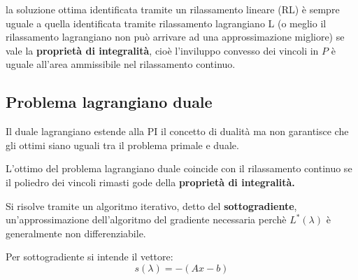 \documentclass[\main/main.tex]{subfiles}
\begin{document}
\begin{theorem}
  la soluzione ottima identificata tramite un rilassamento lineare (RL) è sempre uguale a quella identificata tramite rilassamento lagrangiano L (o meglio il rilassamento lagrangiano non può arrivare ad una approssimazione migliore) se vale la \textbf{proprietà di integralità}, cioè l'inviluppo convesso dei vincoli in $P$ è uguale all'area ammissibile nel rilassamento continuo.
\end{theorem}

\subsection{Problema lagrangiano duale}
Il duale lagrangiano estende alla PI il concetto di dualità ma non garantisce che gli ottimi siano uguali tra il problema primale e duale.

\begin{theorem}
  L'ottimo del problema lagrangiano duale coincide con il rilassamento continuo se il poliedro dei vincoli rimasti gode della \textbf{proprietà di integralità.}
\end{theorem}

Si risolve tramite un algoritmo iterativo, detto del \textbf{sottogradiente}, un'approssimazione dell'algoritmo del gradiente necessaria perchè $L^*(\lambda)$ è generalmente non differenziabile.

\begin{definition}[Sottogradiente]
  Per sottogradiente si intende il vettore:
  \[
    s(\lambda) = -(Ax-b)
  \]
\end{definition}
\end{document}
